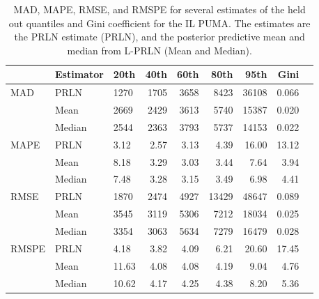 \documentclass[12pt]{article}
\begin{document}
\begin{table}[ht]
  \centering
  \begin{tabular}{lllrrrrrr}
    \hline
           & Estimator & 20th & 40th & 60th & 80th & 95th & Gini \\
    \hline
    MAD    & PRLN         & 1270  & 1705 & 3658 & 8423  & 36108 & 0.066 \\
           & Mean         & 2669  & 2429 & 3613 & 5740  & 15387 & 0.020 \\
           & Median       & 2544  & 2363 & 3793 & 5737  & 14153 & 0.022 \\
    \hline
    MAPE   & PRLN         & 3.12  & 2.57 & 3.13 & 4.39  & 16.00 & 13.12 \\
           & Mean         & 8.18  & 3.29 & 3.03 & 3.44  & 7.64  & 3.94 \\
           & Median       & 7.48  & 3.28 & 3.15 & 3.49  & 6.98  & 4.41 \\
    \hline
    RMSE   & PRLN         & 1870  & 2474 & 4927 & 13429 & 48647 & 0.089 \\
           & Mean         & 3545  & 3119 & 5306 & 7212  & 18034 & 0.025 \\
           & Median       & 3354  & 3063 & 5634 & 7279  & 16479 & 0.028 \\
    \hline
    RMSPE  & PRLN         & 4.18  & 3.82 & 4.09 & 6.21  & 20.60 & 17.45 \\
           & Mean         & 11.63 & 4.08 & 4.08 & 4.19  & 9.04  & 4.76 \\
           & Median       & 10.62 & 4.17 & 4.25 & 4.38  & 8.20  & 5.36 \\
    \hline
  \end{tabular}
  \caption{MAD, MAPE, RMSE, and RMSPE for several estimates of the held out quantiles and Gini coefficient for the IL PUMA. The estimates are the PRLN estimate (PRLN), and the posterior predictive mean and median from L-PRLN (Mean and Median).}
  \label{tab:il.metric}
\end{table}
\end{document}
